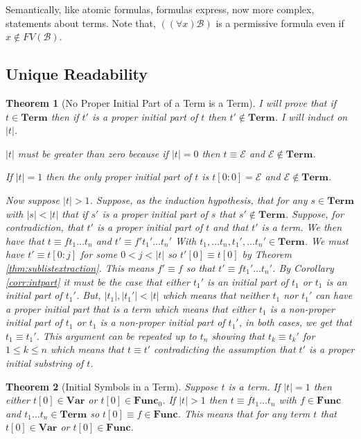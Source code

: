 \documentclass[12pt]{article}
\theoremstyle{break}
\theoremstyle{break}
\newtheorem{theorem}{Theorem}[section]
\theoremstyle{break}
\theoremstyle{break}
\newcommand{\mc}[1]{\mathcal{#1}}
\begin{document}
Semantically, like atomic formulas, formulas express, now more complex, statements about terms.
Note that, $((\forall x) \mc{B})$ is a permissive formula even if $x\not \in FV(\mc{B})$.

\subsection{Unique Readability}

\begin{theorem}[No Proper Initial Part of a Term is a Term]
I will prove that if $t\in\textbf{Term}$ then if $t'$ is a proper initial part of $t$ then $t'\not \in \textbf{Term}$. I will induct on $|t|$.

$|t|$ must be greater than zero because if $|t| = 0$ then $t \equiv \mc{E}$ and $\mc{E}\not \in \textbf{Term}$.

If $|t| = 1$ then the only proper initial part of $t$ is $t[0:0] = \mc{E}$ and $\mc{E} \not \in \textbf{Term}$.

Now suppose $|t|>1$. 
Suppose, as the induction hypothesis, that for any $s\in\textbf{Term}$ with $|s|<|t|$ that if $s'$ is a proper initial part of $s$ that $s'\not \in \textbf{Term}$. 
Suppose, for contradiction, that $t'$ is a proper initial part of $t$ and that $t'$ is a term. 
We then have that $t \equiv ft_1\ldots t_n$ and $t' \equiv f't_1'\ldots t_n'$ With $t_1, \ldots t_n, t_1', \ldots t_n' \in \textbf{Term}$. 
We must have $t' \equiv t[0:j]$ for some $0 < j < |t|$ so $t'[0] \equiv t[0]$ by Theorem \ref{thm:sublistextraction}.
This means $f' \equiv f$ so that $t' \equiv ft_1'\ldots t_n'$. 
By Corollary \ref{corr:intpart} it must be the case that either $t_1'$ is an initial part of $t_1$ or $t_1$ is an initial part of $t_1'$. But, $|t_1|, |t_1'| < |t|$ which means that neither $t_1$ nor $t_1'$ can have a proper initial part that is a term which means that either $t_1$ is a non-proper initial part of $t_1$ or $t_1$ is a non-proper initial part of $t_1'$, in both cases, we get that $t_1\equiv t_1'$.
This argument can be repeated up to $t_n$ showing that $t_k \equiv t_k'$ for $1 \le k \le n$ which means that $t \equiv t'$ contradicting the assumption that $t'$ is a proper initial substring of $t$.
\end{theorem}

\begin{theorem}[Initial Symbols in a Term]
\label{thm:initsymbterm}
Suppose $t$ is a term. If $|t|=1$ then either $t[0] \in \textbf{Var}$ or $t[0] \in \textbf{Func}_0$.
If $|t|>1$ then $t\equiv ft_1\ldots t_n$ with $f\in\textbf{Func}$ and $t_1\ldots t_n\in\textbf{Term}$ so $t[0]\equiv f \in \textbf{Func}$.
This means that for any term $t$ that $t[0] \in \textbf{Var}$ or $t[0]\in\textbf{Func}$.
\end{theorem}
\end{document}
